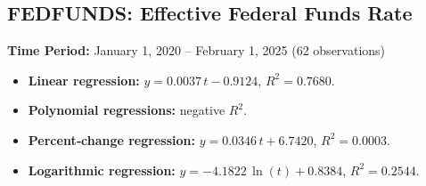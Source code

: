 \documentclass[11pt,a4paper]{article}
\begin{document}
\clearpage
\subsection{FEDFUNDS: Effective Federal Funds Rate}
\textbf{Time Period:} January 1, 2020 – February 1, 2025 (62 observations)

\begin{itemize}
  \item \textbf{Linear regression:} \(y = 0.0037\,t - 0.9124\), \(R^2 = 0.7680\).
  \item \textbf{Polynomial regressions:} negative \(R^2\).
  \item \textbf{Percent‐change regression:} \(y = 0.0346\,t + 6.7420\), \(R^2 = 0.0003\).
  \item \textbf{Logarithmic regression:} \(y = -4.1822\,\ln(t) + 0.8384\), \(R^2 = 0.2544\).
\end{itemize}
\end{document}
